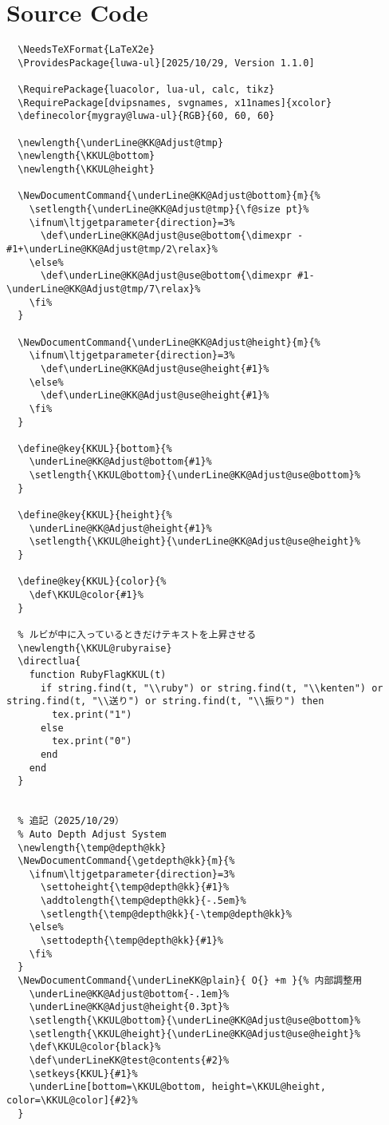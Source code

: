 \documentclass[luatex,fontsize=8pt,paper=b5,twoside]{jlreq}%
\begin{document}
\section{Source Code}
\begin{lstlisting}
  \NeedsTeXFormat{LaTeX2e}
  \ProvidesPackage{luwa-ul}[2025/10/29, Version 1.1.0]

  \RequirePackage{luacolor, lua-ul, calc, tikz}
  \RequirePackage[dvipsnames, svgnames, x11names]{xcolor}
  \definecolor{mygray@luwa-ul}{RGB}{60, 60, 60}

  \newlength{\underLine@KK@Adjust@tmp}
  \newlength{\KKUL@bottom}
  \newlength{\KKUL@height}

  \NewDocumentCommand{\underLine@KK@Adjust@bottom}{m}{%
    \setlength{\underLine@KK@Adjust@tmp}{\f@size pt}%
    \ifnum\ltjgetparameter{direction}=3%
      \def\underLine@KK@Adjust@use@bottom{\dimexpr -#1+\underLine@KK@Adjust@tmp/2\relax}%
    \else%
      \def\underLine@KK@Adjust@use@bottom{\dimexpr #1-\underLine@KK@Adjust@tmp/7\relax}%
    \fi%
  }

  \NewDocumentCommand{\underLine@KK@Adjust@height}{m}{%
    \ifnum\ltjgetparameter{direction}=3%
      \def\underLine@KK@Adjust@use@height{#1}%
    \else%
      \def\underLine@KK@Adjust@use@height{#1}%
    \fi%
  }

  \define@key{KKUL}{bottom}{%
    \underLine@KK@Adjust@bottom{#1}%
    \setlength{\KKUL@bottom}{\underLine@KK@Adjust@use@bottom}%
  }

  \define@key{KKUL}{height}{%
    \underLine@KK@Adjust@height{#1}%
    \setlength{\KKUL@height}{\underLine@KK@Adjust@use@height}%
  }

  \define@key{KKUL}{color}{%
    \def\KKUL@color{#1}%
  }

  % ルビが中に入っているときだけテキストを上昇させる
  \newlength{\KKUL@rubyraise}
  \directlua{
    function RubyFlagKKUL(t)
      if string.find(t, "\\ruby") or string.find(t, "\\kenten") or string.find(t, "\\送り") or string.find(t, "\\振り") then
        tex.print("1")
      else
        tex.print("0")
      end
    end
  }


  % 追記（2025/10/29）
  % Auto Depth Adjust System 
  \newlength{\temp@depth@kk}
  \NewDocumentCommand{\getdepth@kk}{m}{%
    \ifnum\ltjgetparameter{direction}=3%
      \settoheight{\temp@depth@kk}{#1}%
      \addtolength{\temp@depth@kk}{-.5em}%
      \setlength{\temp@depth@kk}{-\temp@depth@kk}%
    \else%
      \settodepth{\temp@depth@kk}{#1}%
    \fi%
  }
  \NewDocumentCommand{\underLineKK@plain}{ O{} +m }{% 内部調整用
    \underLine@KK@Adjust@bottom{-.1em}%
    \underLine@KK@Adjust@height{0.3pt}%
    \setlength{\KKUL@bottom}{\underLine@KK@Adjust@use@bottom}%
    \setlength{\KKUL@height}{\underLine@KK@Adjust@use@height}%
    \def\KKUL@color{black}%
    \def\underLineKK@test@contents{#2}%
    \setkeys{KKUL}{#1}%
    \underLine[bottom=\KKUL@bottom, height=\KKUL@height, color=\KKUL@color]{#2}%
  }


\end{lstlisting}
\end{document}
